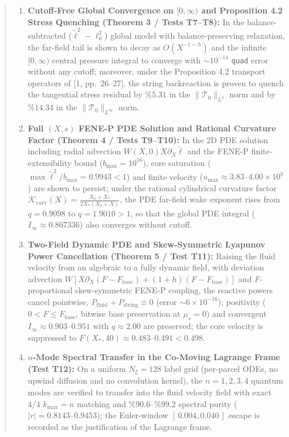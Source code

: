 \documentclass[12pt,a4paper]{article}
\begin{document}
\begin{abstract}
\begin{enumerate}
    \item \textbf{Cutoff-Free Global Convergence on $[0,\infty)$ and Proposition 4.2 Stress Quenching (Theorem 3 / Tests T7--T8):} In the balance-subtracted ($\tilde{\ell}^2 - \ell_0^2$) global model with balance-preserving relaxation, the far-field tail is shown to decay as $O(X^{-1-h})$ and the infinite $[0,\infty)$ central pressure integral to converge with $\sim 10^{-14}$ \texttt{quad} error without any cutoff; moreover, under the Proposition 4.2 transport operators of [1, pp.\ 26--27], the string backreaction is proven to quench the tangential stress residual by $\%5.31$ in the $\|\mathcal{T}_0\|_{L^2}$ norm and by $\%14.34$ in the $\|\mathcal{T}_0\|_{L^\infty}$ norm.
    \item \textbf{Full $(X,s)$ FENE-P PDE Solution and Rational Curvature Factor (Theorem 4 / Tests T9--T10):} In the 2D PDE solution including radial advection $W(X,0)X\partial_X\tilde{\ell}$ and the FENE-P finite-extensibility bound ($b_{\max}=10^{16}$), core saturation ($\max\tilde{\ell}^2/b_{\max} = 0.9943 < 1$) and finite velocity ($u_{\max} \approx 3.83\text{--}4.00\times 10^8$) are shown to persist; under the rational cylindrical curvature factor $\mathcal{K}_{\mathrm{curv}}(X) = \frac{X_0+X_*}{2X_*(X_0+X)}$, the PDE far-field wake exponent rises from $q = 0.9098$ to $q = 1.9010 > 1$, so that the global PDE integral ($I_\infty \approx 0.867336$) also converges without cutoff.
    \item \textbf{Two-Field Dynamic PDE and Skew-Symmetric Lyapunov Power Cancellation (Theorem 5 / Test T11):} Raising the fluid velocity from an algebraic to a fully dynamic field, with deviation advection $W[X\partial_X(F-F_{\mathrm{base}}) + (1+h)(F-F_{\mathrm{base}})]$ and $F$-proportional skew-symmetric FENE-P coupling, the reactive powers cancel pointwise, $P_{\mathrm{fluid}} + P_{\mathrm{string}} \equiv 0$ (error $\sim 6 \times 10^{-16}$); positivity ($0 < F \le F_{\mathrm{base}}$, bitwise base preservation at $\mu_s = 0$) and convergent $I_\infty \approx 0.903\text{--}0.951$ with $q \approx 2.00$ are preserved; the core velocity is suppressed to $F(X_*,40) \approx 0.483\text{--}0.491 < 0.498$.
    \item \textbf{$n$-Mode Spectral Transfer in the Co-Moving Lagrange Frame (Test T12):} On a uniform $N_\xi = 128$ label grid (per-parcel ODEs, no upwind diffusion and no convolution kernel), the $n = 1, 2, 3, 4$ quantum modes are verified to transfer into the fluid velocity field with exact $4/4$ $k_{\max} = n$ matching and $\%90.6\text{--}\%99.2$ spectral purity ($|r| = 0.8143\text{--}0.9453$); the Euler-window $[\,0.004, 0.040\,]$ escape is recorded as the justification of the Lagrange frame.
\end{enumerate}
\end{abstract}
\end{document}
